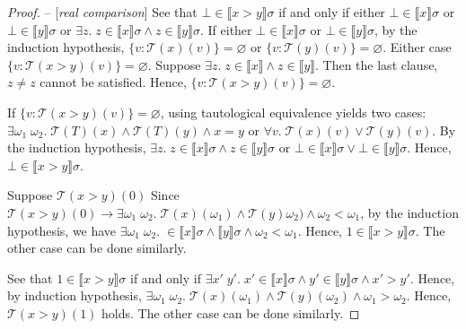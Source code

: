 \documentclass{article}
\newcommand{\sem}[1]{\llbracket #1 \rrbracket }
\newcommand{\trans}[1]{\mathcal{T}( #1) }
\begin{document}
\begin{proof}
\vspace{0.5em}
\noindent
-- [\textit{real comparison}]\quad
See that $\bot\in\sem{x>y}\sigma$ if and only if either $\bot\in\sem{x}\sigma$ or $\bot\in\sem{y}\sigma$ or $\exists z.\;z\in\sem{x}\sigma\land z\in\sem{y}\sigma$. If either $\bot\in\sem{x}\sigma$ or $\bot\in\sem{y}\sigma$, by the induction hypothesis,
$\{v:\trans{x}(v)\} =\varnothing$ or $\{v : \trans{y}(v)\} = \varnothing$. Either case $\{v : \trans{x>y}(v)\} = \varnothing$.
Suppose $\exists z.\; z\in\sem{x}\land z\in\sem{y}$. Then the last clause, $z\neq z$ cannot be satisfied. Hence, $\{v : \trans{x>y}(v)\} = \varnothing$.

If $\{v : \trans{x>y}(v)\} = \varnothing$, using tautological equivalence yields two cases:
$\exists \omega_1\;\omega_2.\; \trans{T}(x)\land\trans{T}(y)\land x=y$
or
$\forall v.\; \trans{x}(v) \lor \trans{y}(v)$. By the induction hypothesis, $\exists z.\; z\in\sem{x}\sigma \land z \in \sem{y}\sigma$ or $\bot\in\sem{x}\sigma \lor \bot\in\sem{y}\sigma$. Hence, $\bot\in\sem{x>y}\sigma$.

Suppose $\trans{x>y}(0)$ Since $\trans{x>y}(0) \to \exists \omega_1\;\omega_2.\; \trans{x}(\omega_1) \land\trans{y}\omega_2)\land \omega_2<\omega_1$, by the induction hypothesis, we have $\exists \omega_1\;\omega_2.\;\in\sem{x}\sigma \land \sem{y}\sigma\land \omega_2<\omega_1$. Hence, $1\in\sem{x>y}\sigma$. The other case can be done similarly. 

See that $1\in\sem{x>y}\sigma$ if and only if $\exists x'\;y'.\; x'\in\sem{x}\sigma\land y'\in\sem{y}\sigma \land x'>y'$. Hence, by induction hypothesis, 
$\exists \omega_1\;\omega_2.\; \trans{x}(\omega_1)\land \trans{y}(\omega_2)\land \omega_1>\omega_2$. 
Hence, $\trans{x>y}(1)$ holds. The other case can be done similarly.




\end{proof}
\end{document}
